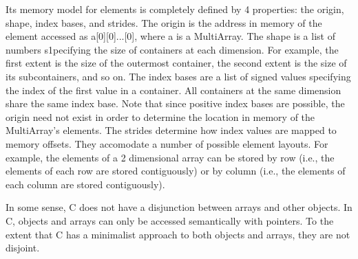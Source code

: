 \documentclass[preprint]{sigplanconf}
\begin{document}
Its memory model for elements is completely defined by 4 properties: the origin, shape, index bases, and strides. The origin is the address in memory of the element accessed as a[0][0]...[0], where a is a MultiArray. The shape is a list of numbers s1pecifying the size of containers at each dimension. For example, the first extent is the size of the outermost container, the second extent is the size of its subcontainers, and so on. The index bases are a list of signed values specifying the index of the first value in a container. All containers at the same dimension share the same index base. Note that since positive index bases are possible, the origin need not exist in order to determine the location in memory of the MultiArray's elements. The strides determine how index values are mapped to memory offsets. They accomodate a number of possible element layouts. For example, the elements of a 2 dimensional array can be stored by row (i.e., the elements of each row are stored contiguously) or by column (i.e., the elements of each column are stored contiguously).


In some sense, C does not have a disjunction between arrays and other objects. In C, objects and arrays can only be accessed semantically with pointers. To the extent that C has a minimalist approach to both objects and arrays, they are not disjoint.
\end{document}
